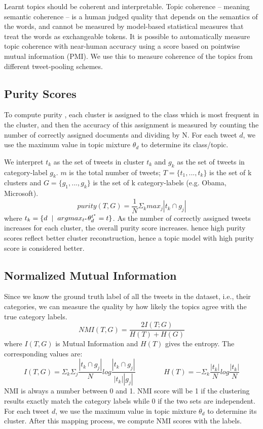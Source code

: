 \documentclass[10pt,a5paper,twoside]{article}
\begin{document}
Learnt topics should be coherent and interpretable.  Topic coherence –
meaning semantic coherence – is a human judged quality that depends on
the semantics of the words, and cannot be measured by model-based
statistical measures that treat the words as exchangeable tokens.  It
is possible to automatically measure topic coherence with near-human
accuracy \cite{baldwin10} using a score based on pointwise mutual
information (PMI).  We use this to measure coherence of the topics
from different tweet-pooling schemes.

\subsection{Purity Scores}

To compute purity \cite{MRS08}, each cluster is assigned to the class
which is most frequent in the cluster, and then the accuracy of this
assignment is measured by counting the number of correctly assigned
documents and dividing by N. For each tweet $d$, we use the maximum
value in topic mixture $\theta_{d} $ to determine its class/topic.

We interpret $t_{k}$ as the set of tweets in cluster $t_{k}$ and
$g_{k}$ as the set of tweets in category-label $g_{k}$. $m$ is the
total number of tweets; $T = \lbrace t_{1}, ... , t_{k} \rbrace$ is
the set of k clusters and $ G = \lbrace g_{1}, ... , g_{k}\rbrace $ is
the set of k category-labels (e.g. Obama, Microsoft).
\[
 purity (T,G) = \frac{1}{N} \Sigma_{k} max_{j} |t_{k} \cap g_{j}|
\]
where $ t_k = \lbrace  d \hspace{2 mm} |  \hspace{2 mm} argmax_{t^*} \theta^{t^{*}}_d = t \rbrace $.
As the number of correctly assigned tweets increases for each cluster,
the overall purity score increases. hence high purity scores reflect
better cluster reconstruction, hence a topic model with high purity
score is considered better.

\subsection{Normalized Mutual Information}

Since we know the ground truth label of all the tweets in the dataset,
i.e., their categories, we can measure the quality by how likely the
topics agree with the true category labels.
\[
NMI(T,G) = \frac{2 I(T;G)}{H(T) + H(G)} 
\]
where $I(T,G)$ is Mutual Information and $H(T)$ gives the entropy. The 
corresponding values are:
\[
I(T,G) = \Sigma_{k} \Sigma_{j} \frac{|t_{k} \cap g_{j}|}{N} log \frac{|t_{k} \cap g_{j}|}{|t_{k}| |g_{j}|} 
~~~~~~~~~~~~~~~~~~
H(T) = - \Sigma_k \frac{|t_k|}{N} log \frac{|t_k|}{N} 
\]
NMI \cite{MRS08} is always a number between 0 and 1. NMI score will be
1 if the clustering results exactly match the category labels while 0
if the two sets are independent. For each tweet $d$, we use the
maximum value in topic mixture $ \theta_{d} $ to determine its
cluster. After this mapping process, we compute NMI scores with the
labels.
\end{document}
